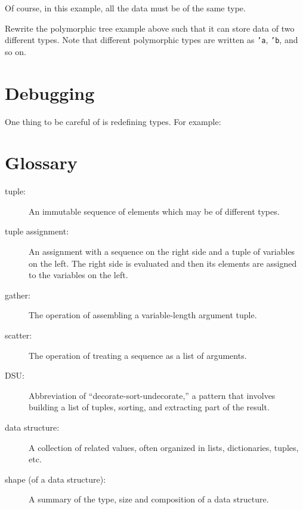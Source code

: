 \documentclass[10pt]{book}
\begin{document}
{Of course, in this example, all the data must be of the same type.

\begin{exercise}
Rewrite the polymorphic tree example above such that it can store data of two different types. Note that different polymorphic types are written as {\tt 'a}, {\tt 'b}, and so on. 
\end{exercise}


\section{Debugging}



One thing to be careful of is redefining types. For example:


\section{Glossary}

\begin{description}

\item[tuple:] An immutable sequence of elements which may be of different types.

\item[tuple assignment:] An assignment with a sequence on the
right side and a tuple of variables on the left.  The right
side is evaluated and then its elements are assigned to the
variables on the left.

\item[gather:] The operation of assembling a variable-length
argument tuple.

\item[scatter:] The operation of treating a sequence as a list of
arguments.

\item[DSU:] Abbreviation of ``decorate-sort-undecorate,'' a
pattern that involves building a list of tuples, sorting, and
extracting part of the result.

\item[data structure:] A collection of related values, often
organized in lists, dictionaries, tuples, etc.

\item[shape (of a data structure):] A summary of the type,
size and composition of a data structure.


\end{description}}
\end{document}
